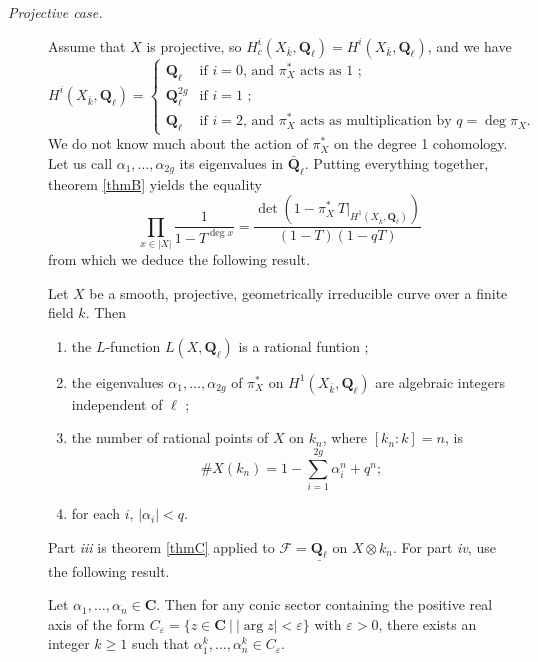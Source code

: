 \begin{description} 
\item[\it Projective case.]
Assume that $X$ is projective, so $H_c^i(X_{\bar k}, \mathbf{Q}_\ell) = 
H^i(X_{\bar k}, \mathbf{Q}_\ell)$, and we have
$$ 
H^i(X_{\bar k}, \mathbf{Q}_\ell) =
\left\{
\begin{matrix}
\mathbf{Q}_\ell & \text{if $i = 0$, and $\pi_X^*$ acts as 1 ;} \\
\mathbf{Q}_\ell^{2g} & \text{if $i = 1$ ;} \\
\mathbf{Q}_\ell & \text{if $i = 2$, and $\pi_X^*$ acts as multiplication by 
$q=\deg \pi_X$.} 
\end{matrix}
\right.
$$
We do not know much about the action of $\pi_X^*$ on the degree 1 cohomology. 
Let us call $\alpha_1, \ldots, \alpha_{2g}$ its eigenvalues in 
$\bar{\mathbf{Q}}_\ell$. Putting everything together, theorem \ref{thmB} yields 
the equality
$$
\prod_{x\in |X|} \frac{1}{1-T^{\deg x}} = \frac{\det\left(1- \pi_X^*\ 
T\big|_{H^1(X_{\bar k}, \mathbf{Q}_\ell)}\right)}{(1-T)(1-qT)}
$$
from which we deduce the following result.

\begin{lemma}
Let $X$ be a smooth, projective, geometrically irreducible curve over a finite 
field $k$. Then
\begin{enumerate}
\item the $L$-function $L(X, \mathbf{Q}_\ell)$ is a rational funtion ;
\item the eigenvalues $\alpha_1, \ldots, \alpha_{2g}$ of $\pi_X^*$ on 
$H^1(X_{\bar k}, \mathbf{Q}_\ell)$ are algebraic integers independent of $\ell$ 
;
\item the number of rational points of $X$ on $k_n$, where $[k_n: k] = n$, is  
$$
\# X(k_n) = 1-\sum_{i=1}^{2g}\alpha_i^n +q^n ; 
$$ 
\item 
for each $i$, $|\alpha_i| < q$. 
\end{enumerate}
\end{lemma}	

Part {\it iii} is theorem \ref{thmC} applied to $\mathcal{F} = 
\underline{\mathbf{Q}_\ell}$ on $X\otimes k_n$. For part {\it iv}, use the 
following result.
\begin{exercise}
Let $\alpha_1, \dots, \alpha_n \in \mathbf{C}$. Then for any conic sector 
containing the positive real axis of the form $C_\varepsilon = \{ z \in 
\mathbf{C} \ | \ |\arg z| < \varepsilon \}$ with $\varepsilon >0$, there exists 
an integer $k \geq 1$ such that $\alpha_1^k, \dots, \alpha_n^k \in 
C_\varepsilon$.
\end{exercise}


\end{description}
